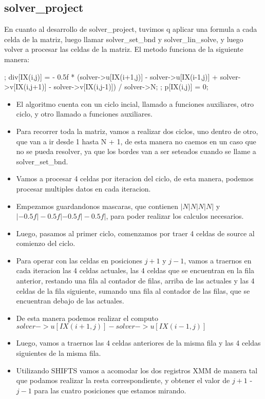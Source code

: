 \subsection{solver\_project}
En cuanto al desarrollo de solver\_project, tuvimos q aplicar una formula a cada celda de la matriz, luego llamar solver\_set\_bnd y solver\_lin\_solve, y luego volver a procesar las celdas de la matriz.
El metodo funciona de la siguiente manera:



; 	div[IX(i,j)] = - 0.5f * (solver->u[IX(i+1,j)] - solver->u[IX(i-1,j)] + solver->v[IX(i,j+1)] - solver->v[IX(i,j-1)]) / solver->N;
	; 	p[IX(i,j)] = 0;

\begin{itemize}
\item El algoritmo cuenta con un ciclo incial, llamado a funciones auxiliares, otro ciclo, y otro llamado a funciones auxiliares.
\item Para recorrer toda la matriz, vamos a realizar dos ciclos, uno dentro de otro, que van a ir desde 1 hasta N + 1, de esta manera no caemos en un caso que no se pueda resolver, ya que los bordes van a ser seteados cuando se llame a solver_set_bnd.
\item Vamos a procesar 4 celdas por iteracion del ciclo, de esta manera, podemos procesar multiples datos en cada iteracion.
\item Empezamos guardandonos mascaras, que contienen $|N|N|N|N|$ y $|-0.5f|-0.5f|-0.5f|-0.5f|$, para poder realizar los calculos necesarios.
\item Luego, pasamos al primer ciclo, comenzamos por traer 4 celdas de source al comienzo del ciclo.
\item Para operar con las celdas en posiciones $j+1$ y $j-1$, vamos a traernos en cada iteracion las 4 celdas actuales, las 4 celdas que se encuentran en la fila anterior, restando una fila al contador de filas, arriba de las actuales y las 4 celdas de la fila siguiente, sumando una fila al contador de las filas, que se encuentran debajo de las actuales.
\item De esta manera podemos realizar el computo $solver->u[IX(i+1,j)] - solver->u[IX(i-1,j)]$
\item Luego, vamos a traernos las 4 celdas anteriores de la misma fila y las 4 celdas siguientes de la misma fila.
\item Utilizando SHIFTS vamos a acomodar los dos registros XMM de manera tal que podamos realizar la resta correspondiente, y obtener el valor de $j+1$ - $j-1$ para las cuatro posiciones que estamos mirando.

\end{itemize}
